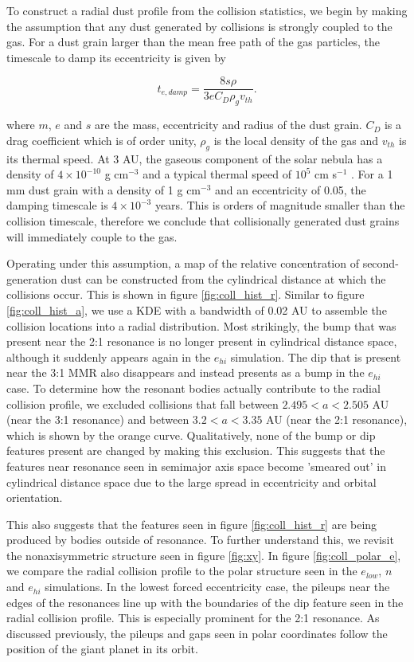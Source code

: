\documentclass[onecolumn]{aastex63}
\begin{document}
To construct a radial dust profile from the collision statistics, we begin by making the assumption that any dust generated by collisions is strongly coupled to the gas. For a dust grain larger than the mean free path of the gas particles, the timescale to damp its eccentricity is given by \citep{1976PThPh..56.1756A}

\begin{equation}\label{eq:t_edamp}
    t_{e, damp} = \frac{8 s \rho}{3 e C_{D} \rho_{g} v_{th}}.
\end{equation}

\noindent where $m$, $e$ and $s$ are the mass, eccentricity and radius of the dust grain. $C_{D}$ is a drag coefficient which is of order unity, $\rho_{g}$ is the local density of the gas and $v_{th}$ is its thermal speed. At 3 AU, the gaseous component of the solar nebula has a density of $4 \times 10^{-10}$ g cm$^{-3}$ and a typical thermal speed of $10^{5}$ cm s$^{-1}$ \citep{1981PThPS..70...35H}. For a 1 mm dust grain with a density of 1 g cm$^{-3}$ and an eccentricity of 0.05, the damping timescale is $4 \times 10^{-3}$ years. This is orders of magnitude smaller than the collision timescale, therefore we conclude that collisionally generated dust grains will immediately couple to the gas.

Operating under this assumption, a map of the relative concentration of second-generation dust can be constructed from the cylindrical 
distance at which the collisions occur. This is shown in figure \ref{fig:coll_hist_r}. Similar to figure \ref{fig:coll_hist_a}, we use a KDE with a bandwidth of 0.02 AU to assemble the collision locations into a radial distribution. Most strikingly, the bump that was present near the 2:1 resonance is no longer present in cylindrical distance space, although it suddenly appears again in the $e_{hi}$ simulation. The dip that is present near the 3:1 MMR also disappears and instead presents as a bump in the $e_{hi}$ case. To determine how the resonant bodies actually contribute to the radial collision profile, we excluded collisions that fall between $2.495 < a < 2.505$ AU (near the 3:1 resonance) and between $3.2 < a < 3.35$ AU (near the 2:1 resonance), which is shown by the orange curve. Qualitatively, none of the bump or dip features present are changed by making this exclusion. This suggests that the features near resonance seen in semimajor axis space become 'smeared out' in cylindrical distance space due to the large spread in eccentricity and orbital orientation.

This also suggests that the features seen in figure \ref{fig:coll_hist_r} are being produced by bodies outside of resonance. To further understand this, we revisit the nonaxisymmetric structure seen in figure \ref{fig:xy}. In figure \ref{fig:coll_polar_e}, we compare the radial collision profile to the polar structure seen in the $e_{low}$, $n$ and $e_{hi}$ simulations. In the lowest forced eccentricity case, the pileups near the edges of the resonances line up with the boundaries of the dip feature seen in the radial collision profile. This is especially prominent for the 2:1 resonance. As discussed previously, the pileups and gaps seen in polar coordinates follow the position of the giant planet in its orbit.
\end{document}
